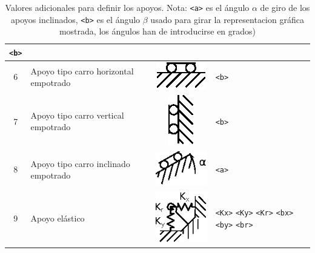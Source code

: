\documentclass[a4paper,11pt]{article}
\begin{document}
\begin{table}
\begin{center}
\begin{tabular}{c p{4cm} c l}
\texttt{<b>} \\
\hline
6 & Apoyo tipo carro horizontal empotrado & 
\multicolumn{1}{m{2cm}}{\centering\includegraphics{figures/apoyo_empotrado_carro_horizontal.eps}} & 
\texttt{<b>} \\
\hline
7 & Apoyo tipo carro vertical empotrado & 
\multicolumn{1}{m{2cm}}{\centering\includegraphics{figures/apoyo_empotrado_carro_vertical.eps}} & 
\texttt{<b>} \\
\hline
8 & Apoyo tipo carro inclinado empotrado & 
\multicolumn{1}{m{2cm}}{\centering\includegraphics{figures/apoyo_empotrado_carro_inclinado.eps}} & 
\texttt{<a>} \\
\hline
9 & Apoyo el\'astico & 
\multicolumn{1}{m{2cm}}{\centering\includegraphics{figures/apoyo_elastico.eps}} & 
\texttt{<Kx>}  \texttt{<Ky>} \texttt{<Kr>} \texttt{<bx>} \texttt{<by>} \texttt{<br>} \\
\bottomrule
\end{tabular}
\end{center}
\caption{Valores adicionales para definir los apoyos. Nota: \texttt{<a>} es el \'angulo $\alpha$ de giro de los apoyos inclinados, \texttt{<b>} es el \'angulo $\beta$ usado para girar la representacion gr\'afica mostrada, los \'angulos han de introducirse en grados)}
\label{tab:valores}
\end{table}
\end{document}
